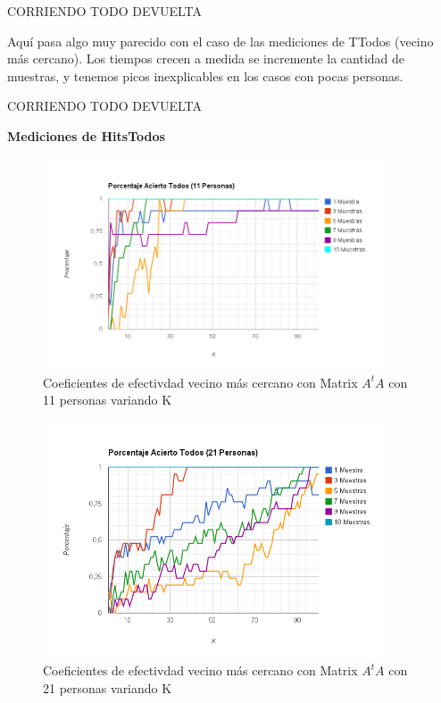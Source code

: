 CORRIENDO TODO DEVUELTA


Aquí pasa algo muy parecido con el caso de las mediciones de TTodos (vecino más cercano). Los
tiempos crecen a medida se incremente la cantidad de muestras, y tenemos picos inexplicables en los
casos con pocas personas.

CORRIENDO TODO DEVUELTA

\textbf{Mediciones de HitsTodos }

\begin{figure}[H]
\includegraphics[width=0.90\textwidth]{img/image10.png}
     \caption{Coeficientes de efectivdad vecino más cercano con Matrix $A^tA$ con 11 personas variando K}
\end{figure}

\begin{figure}[H]
\includegraphics[width=0.90\textwidth]{img/image11.png}
     \caption{Coeficientes de efectivdad vecino más cercano con Matrix $A^tA$ con 21 personas variando K}
\end{figure}

